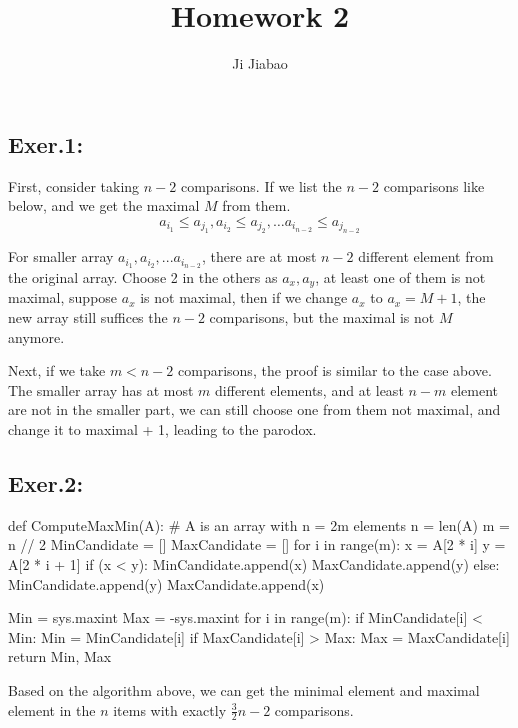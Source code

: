 \documentclass[UTF8]{ctexart}
\begin{document}
 

\title{Homework 2}
\author{Ji Jiabao}
\maketitle

\subsection*{Exer.1:}
    First, consider taking $n - 2$ comparisons.
    If we list the $n - 2$ comparisons like below, and we get the maximal $M$ from them.
    $$
        a_{i_1} \leq a_{j_1},
        a_{i_2} \leq a_{j_2},
        \dots
        a_{i_{n -2}} \leq a_{j_{n - 2}}
    $$

    For smaller array $a_{i_1}, a_{i_2}, ... a_{i_{n - 2}}$, there are at most $n - 2$ different element from
    the original array. Choose 2 in the others as $a_{x}, a_{y}$, at least one of them is not maximal,
    suppose $a_{x}$ is not maximal, then if we change $a_x$ to $a_{x} = M + 1$, the new array still suffices 
    the $n - 2$ comparisons, but the maximal is not $M$ anymore.

    Next, if we take $m < n - 2$ comparisons, the proof is similar to the case above. The smaller array
    has at most $m$ different elements, and at least $n - m$ element are not in the smaller part, we can still
    choose one from them not maximal, and change it to maximal + 1, leading to the parodox.


\subsection*{Exer.2:}
\begin{python}
    def ComputeMaxMin(A):
        # A is an array with n = 2m elements
        n = len(A)
        m = n // 2
        MinCandidate = []
        MaxCandidate = []
        for i in range(m):
            x = A[2 * i]
            y = A[2 * i + 1]
            if (x < y):
                MinCandidate.append(x)
                MaxCandidate.append(y)
            else:
                MinCandidate.append(y)
                MaxCandidate.append(x)
        
        Min = sys.maxint
        Max = -sys.maxint
        for i in range(m):
            if MinCandidate[i] < Min:
                Min = MinCandidate[i]
            if MaxCandidate[i] > Max:
                Max = MaxCandidate[i]
        return Min, Max
\end{python}
    \hspace*{1em} Based on the algorithm above, we can get the minimal element and maximal element in the $n$ items
    with exactly $\frac{3}{2} n - 2$ comparisons.
\end{document}
